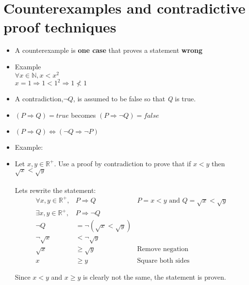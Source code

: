 \documentclass[english,10pt,a4paper]{article}
\begin{document}
\newpage
\section{Counterexamples and contradictive proof techniques}

\begin{theo}[Counterexample] 
\begin{itemize}
\item A counterexample is \textbf{one case} that proves a statement \textbf{wrong}
\item Example
\\
$\forall x \in \mathbb{N}, x < x^2$ \\
$x=1 \Rightarrow 1 < 1^2 \Rightarrow 1 \not < 1$
\end{itemize}
\end{theo}

\begin{theo} 
\begin{itemize}
\item A contradiction,$\neg Q$, is assumed to be false so that \textit{Q} is true.
\item[] $(P \Rightarrow Q) = true$ becomes $(P \Rightarrow \neg Q) = false$
\item[] $(P \Rightarrow Q) \Leftrightarrow (\neg Q \Rightarrow \neg P)$
\item Example:
\item[] Let $x, y \in \mathbb{R}^{+}$. Use a proof by contradiction to prove that if $x<y$ then $\sqrt{x} < \sqrt{y}$
\\
\\
Lets rewrite the statement:
\begin{align}
\forall x, y \in \mathbb{R}^+, &P \Rightarrow Q & P = x < y \text{ and } Q = \sqrt{x}<\sqrt{y} \\
\exists x, y \in \mathbb{R}^+, &P \Rightarrow \neg Q \\
\neg Q &= \neg(\sqrt{x} < \sqrt{y})\\
\neg\sqrt{x} &< \neg \sqrt{y} \\
\sqrt{x} &\geq \sqrt{y} & \text{Remove negation}\\
x &\geq y & \text{Square both sides}
\end{align}

Since $x<y$ and $x\geq y$ is clearly not the same, the statement is proven.
\end{itemize}
\end{theo}
\end{document}

